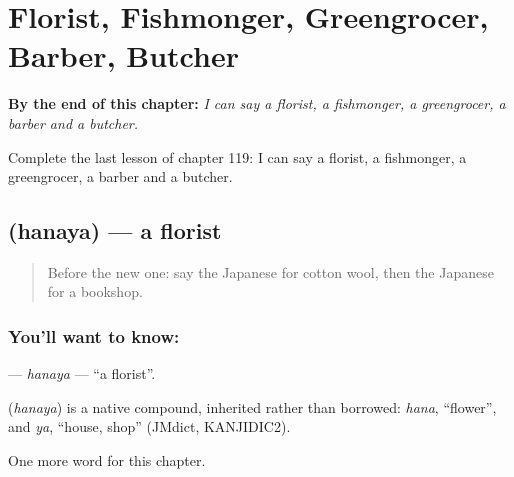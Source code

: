 
\chapter{Florist, Fishmonger, Greengrocer, Barber, Butcher}
\label{ch:ja-florist-fishmonger-greengrocer-barber-butcher}

\begin{chapteropening}
\textbf{By the end of this chapter:} \emph{I can say a florist, a fishmonger, a greengrocer, a barber and a butcher.}

Complete the last lesson of chapter 119: I can say a florist, a fishmonger, a greengrocer, a barber and a butcher.
\end{chapteropening}

\section[\texorpdfstring{\ja{はなや} (hanaya)}{はなや (hanaya)}]{ (hanaya) — a florist}

\label{lesson:JA-C119-hanaya}



\begin{quote}
Before the new one: say the Japanese for cotton wool, then the Japanese for a bookshop.
\end{quote}

\subsection*{You'll want to know: }
\textbf{} — \emph{hanaya} — \textquotedblleft{}a florist\textquotedblright{}.

\begin{cousinweb}
\textbf{} (\emph{hanaya}) is a native compound, inherited rather than borrowed: \emph{hana}, \textquotedblleft{}flower\textquotedblright{}, and \emph{ya}, \textquotedblleft{}house, shop\textquotedblright{} (JMdict, KANJIDIC2).
\end{cousinweb}

\begin{grammarlens}[title={What you've built}]
One more word for this chapter.
\end{grammarlens}

